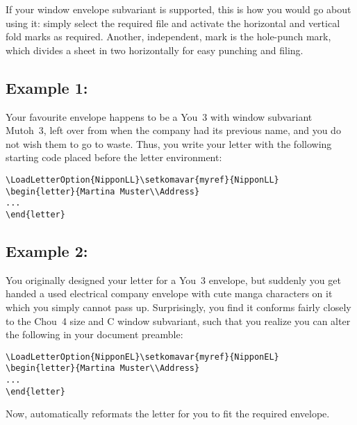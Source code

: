 If your window envelope subvariant is supported, this is how you would
go about using it: simply select the required  file and
activate the horizontal and vertical fold marks as required. Another,
independent, mark is the hole-punch mark, which divides a sheet in two
horizontally for easy punching and filing.

\subsection{Example 1:}
Your favourite envelope happens to be a You~3 with window subvariant
Mutoh~3, left over from when the company had its previous name, and
you do not wish them to go to waste. Thus, you write your letter with
the following starting code placed before the letter environment:

\begin{lstlisting}
\LoadLetterOption{NipponLL}\setkomavar{myref}{NipponLL}
\begin{letter}{Martina Muster\\Address}
...
\end{letter}
\end{lstlisting}

\subsection{Example 2:}
You originally designed your letter for a You~3 envelope, but suddenly
you get handed a used electrical company envelope with cute manga
characters on it which you simply cannot pass up. Surprisingly, you
find it conforms fairly closely to the Chou~4 size and C window
subvariant, such that you realize you can alter the following in your
document preamble:

\begin{lstlisting}
\LoadLetterOption{NipponEL}\setkomavar{myref}{NipponEL}
\begin{letter}{Martina Muster\\Address}
...
\end{letter}
\end{lstlisting}

Now,  automatically reformats the letter for you to
fit the required envelope.


